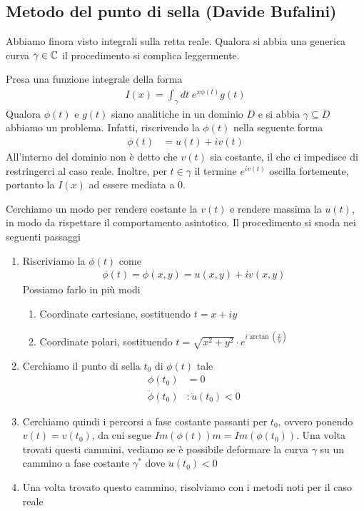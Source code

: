 \newpage

\subsection{Metodo del punto di sella (Davide Bufalini)}

Abbiamo finora visto integrali sulla retta reale. Qualora si abbia una generica curva $\gamma \in \mathbb{C}$ il procedimento si complica leggermente. 

Presa una funzione integrale della forma
\begin{align}
	I(x) = \int_\gamma dt \; e^{x\phi(t)} g(t)
\end{align}
Qualora $\phi(t)$ e $g(t)$ siano analitiche in un dominio $\mathit{D}$ e si abbia $\gamma \subseteq \mathit{D}$ abbiamo un problema. Infatti, riscrivendo la $\phi(t)$ nella seguente forma
\begin{align}
	\phi(t) &= u(t) + iv(t)
\end{align}
All'interno del dominio non è detto che $v(t)$ sia costante, il che ci impedisce di restringerci al caso reale. Inoltre, per $t \in \gamma$ il termine $e^{iv(t)}$ oscilla fortemente, portanto la $I(x)$ ad essere mediata a 0. 

Cerchiamo un modo per rendere costante la $v(t)$ e rendere massima la $u(t)$, in modo da rispettare il comportamento asintotico.
Il procedimento si snoda nei seguenti passaggi
\begin{enumerate}
	\item Riscriviamo la $\phi(t)$ come
	\begin{align}
		\phi(t) = \phi(x,y) = u(x,y) + iv(x,y)
	\end{align}
	Possiamo farlo in più modi
	\begin{enumerate}
		\item Coordinate cartesiane, sostituendo $t = x + iy$
		\item Coordinate polari, sostituendo $t = \sqrt{x^2 + y^2}\cdot e^{i \arctan \left(\frac{x}{y}\right)}$
	\end{enumerate}
	\item Cerchiamo il punto di sella $t_0$ di $\phi(t)$ tale
	\begin{align}
		\phi(t_0) &= 0 \\
		\ddot{\phi}(t_0) &: \ddot{u}(t_0) <0 
	\end{align}
	\item Cerchiamo quindi i percorsi a fase costante passanti per $t_0$, ovvero ponendo $v(t)= v(t_0)$, da cui segue $Im(\phi(t)) m= Im(\phi(t_0))$. Una volta trovati questi cammini, vediamo se è possibile deformare la curva $\gamma$ su un cammino a fase costante $\gamma^*$ dove $\ddot{u}(t_0) <0$  
	\item Una volta trovato questo cammino, risolviamo con i metodi noti per il caso reale
	
\end{enumerate}


